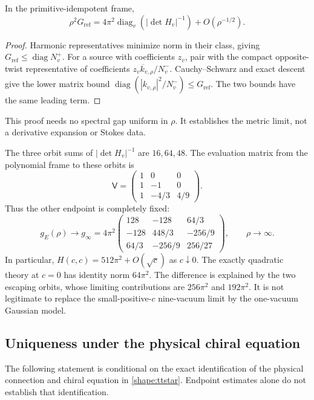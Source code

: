 \begin{proposition}\label{end:squeeze}
In the primitive-idempotent frame,
\[
\rho^2G_{\mathrm{ref}}
 =4\pi^2\operatorname{diag}_v(|\det H_v|^{-1})
                         +O(\rho^{-1/2}).
\]
\end{proposition}
\begin{proof}
Harmonic representatives minimize norm in their class, giving
$G_{\mathrm{ref}}\le\operatorname{diag}N_v^+$.
For a source with coefficients $z_v$, pair with the compact
opposite-twist representative of coefficients
$\overline{z_vk_{v,\rho}}/N_v^-$. Cauchy--Schwarz and exact descent
give the lower matrix bound
$\operatorname{diag}(|k_{v,\rho}|^2/N_v^-)\le G_{\mathrm{ref}}$.
The two bounds have the same leading term.
\end{proof}
This proof needs no spectral gap uniform in $\rho$.
It establishes the metric limit, not a derivative expansion or
Stokes data.

The three orbit sums of $|\det H_v|^{-1}$ are $16,64,48$.
The evaluation matrix from the polynomial frame to these orbits is
\[
\mathsf V=\begin{pmatrix}1&0&0\\1&-1&0\\1&-4/3&4/9\end{pmatrix}.
\]
Thus the other endpoint is completely fixed:
\begin{equation}\label{end:large-rho}
g_E(\rho)\longrightarrow g_\infty
=4\pi^2
\begin{pmatrix}
128&-128&64/3\\
-128&448/3&-256/9\\
64/3&-256/9&256/27
\end{pmatrix},
\qquad \rho\to\infty.
\end{equation}
In particular,
$H(c,c)=512\pi^2+O(\sqrt c)$ as $c\downarrow0$.
The exactly quadratic theory at $c=0$ has identity norm
$64\pi^2$. The difference is explained by the two escaping orbits,
whose limiting contributions are $256\pi^2$ and $192\pi^2$.
It is not legitimate to replace the small-positive-$c$ nine-vacuum
limit by the one-vacuum Gaussian model.

\subsection{Uniqueness under the physical chiral equation}
The following statement is conditional on the exact identification
of the physical connection and chiral equation in
\eqref{shape:ttstar}. Endpoint estimates alone do not establish that
identification.

